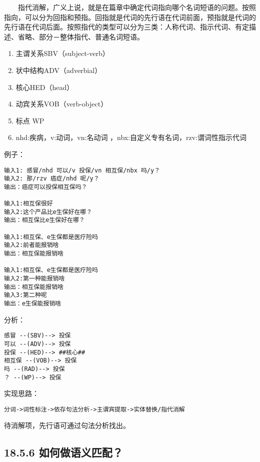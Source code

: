   指代消解，广义上说，就是在篇章中确定代词指向哪个名词短语的问题。按照指向，可以分为回指和预指。回指就是代词的先行语在代词前面，预指就是代词的先行语在代词后面。按照指代的类型可以分为三类：人称代词、指示代词、有定描述、省略、部分－整体指代、普通名词短语。

\begin{enumerate}
\def\labelenumi{\arabic{enumi}.}
\item
  主谓关系SBV（subject-verb）
\item
  状中结构ADV（adverbial）
\item
  核心HED（head）
\item
  动宾关系VOB（verb-object）
\item
  标点 WP
\item
  nhd:疾病，v:动词，vn:名动词 ，nbx:自定义专有名词，rzv:谓词性指示代词
\end{enumerate}

例子：

\begin{verbatim}
输入1: 感冒/nhd 可以/v 投保/vn 相互保/nbx 吗/y？
输入2: 那/rzv 癌症/nhd 呢/y？
输出：癌症可以投保相互保吗？

输入1:相互保很好
输入2:这个产品比e生保好在哪？
输出：相互保比e生保好在哪？

输入1:相互保、e生保都是医疗险吗
输入2:前者能报销啥 
输出：相互保能报销啥

输入1:相互保、e生保都是医疗险吗
输入2:第一种能报销啥 
输出：相互保能报销啥
输入3:第二种呢 
输出：e生保能报销啥
\end{verbatim}

分析：

\begin{verbatim}
感冒 --(SBV)--> 投保
可以 --(ADV)--> 投保
投保 --(HED)--> ##核心##
相互保 --(VOB)--> 投保
吗 --(RAD)--> 投保
？ --(WP)--> 投保
\end{verbatim}

实现思路：

\begin{verbatim}
分词->词性标注->依存句法分析->主谓宾提取->实体替换/指代消解
\end{verbatim}

待消解项，先行语可通过句法分析找出。

\subsection{18.5.6
如何做语义匹配？}\label{ux5982ux4f55ux505aux8bedux4e49ux5339ux914d}

